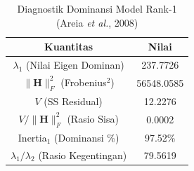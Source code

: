 \begin{table}[H]
\centering
\small
\caption{Diagnostik Dominansi Model Rank-1 (Areia \textit{et al.}, 2008)} \label{tab:app1struktur_diagnostik}
\begin{tabular}{|c|c|}
\hline
\textbf{Kuantitas} & \textbf{Nilai} \\
\hline
$\lambda_1$ (Nilai Eigen Dominan) & 237.7726 \\
$\|\mathbf{H}\|_F^2$ (Frobenius$^2$) & 56548.0585 \\
$V$ (SS Residual) & 12.2276 \\
$V / \|\mathbf{H}\|_F^2$ (Rasio Sisa) & 0.0002 \\
Inertia$_1$ (Dominansi \%) & 97.52\% \\
$\lambda_1 / \lambda_2$ (Rasio Kegentingan) & 79.5619 \\
\hline
\end{tabular}
\end{table}